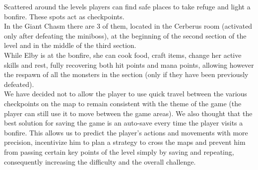 Scattered around the levels players can find safe places to take refuge and light a bonfire. These spots act as checkpoints.\\
In the Giant Chasm there are 3 of them, located in the Cerberus room (activated only after defeating the miniboss), at the beginning of the second section of the level and in the middle of the third section.\\
While Elby is at the bonfire, she can cook food, craft items, change her active skills and rest, fully recovering both hit points and mana points, allowing however the respawn of all the monsters in the section (only if they have been previously defeated).\\
We have decided not to allow the player to use quick travel between the various checkpoints on the map to remain consistent with the theme of the game (the player can still use it to move between the game areas). We also thought that the best solution for saving the game is an auto-save every time the player visits a bonfire. This allows us to predict the player's actions and movements with more precision, incentivize him to plan a strategy to cross the maps and prevent him from passing certain key points of the level simply by saving and repeating, consequently increasing the difficulty and the overall challenge.


